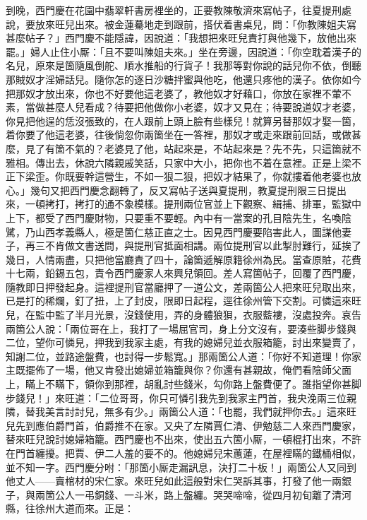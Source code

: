 到晚，西門慶在花園中翡翠軒書房裡坐的，正要教陳敬濟來寫帖子，往夏提刑處說，要放來旺兒出來。被金蓮驀地走到跟前，搭伏着書桌兒，{}問：「你教陳姐夫寫甚麼帖子？」西門慶不能隱諱，因說道：「我想把來旺兒責打與他幾下，放他出來罷。」婦人止住小厮：「且不要叫陳姐夫來。」坐在旁邊，因說道：「你空耽着漢子的名兒，原來是箇隨風倒舵、順水推船的行貨子！我那等對你說的話兒你不依，倒聽那賊奴才淫婦話兒。隨你怎的逐日沙糖拌蜜與他吃，他還只疼他的漢子。依你如今把那奴才放出來，你也不好要他這老婆了，教他奴才好藉口，你放在家裡不葷不素，當做甚麼人兒看成？待要把他做你小老婆，奴才又見在；待要說道奴才老婆，你見把他逞的恁沒張致的，在人跟前上頭上臉有些樣兒！就算另替那奴才娶一箇，着你要了他這老婆，往後倘忽你兩箇坐在一答裡，那奴才或走來跟前回話，或做甚麼，見了有箇不氣的？老婆見了他，站起來是，不站起來是？先不先，只這箇就不雅相。{}傳出去，休說六隣親戚笑話，只家中大小，把你也不着在意裡。正是上梁不正下梁歪。你既要幹這營生，不如一狠二狠，把奴才結果了，{}你就摟着他老婆也放心。」{}幾句又把西門慶念翻轉了，反又寫帖子送與夏提刑，教夏提刑限三日提出來，一頓拷打，拷打的通不象模樣。提刑兩位官並上下觀察、緝捕、排軍，監獄中上下，都受了西門慶財物，只要重不要輕。內中有一當案的孔目陰先生，名喚陰騭，乃山西孝義縣人，極是箇仁慈正直之士。因見西門慶要陷害此人，圖謀他妻子，再三不肯做文書送問，與提刑官抵面相講。兩位提刑官以此掣肘難行，延挨了幾日，人情兩盡，只把他當廳責了四十，論箇遞解原籍徐州為民。當查原賍，花費十七兩，鉛錫五包，責令西門慶家人來興兒領回。差人寫箇帖子，回覆了西門慶，隨教即日押發起身。這裡提刑官當廳押了一道公文，差兩箇公人把來旺兒取出來，已是打的稀爛，釘了扭，上了封皮，限即日起程，逕往徐州管下交割。可憐這來旺兒，在監中監了半月光景，沒錢使用，弄的身體狼狽，衣服藍褸，沒處投奔。哀告兩箇公人說：「兩位哥在上，我打了一場屈官司，身上分文沒有，要湊些脚步錢與二位，望你可憐見，押我到我家主處，有我的媳婦兒並衣服箱籠，討出來變賣了，知謝二位，並路途盤費，也討得一步鬆寬。」那兩箇公人道：「你好不知道理！你家主既擺佈了一場，他又肯發出媳婦並箱籠與你？{}你還有甚親故，俺們看陰師父面上，瞞上不瞞下，領你到那裡，胡亂討些錢米，勾你路上盤費便了。誰指望你甚脚步錢兒！」來旺道：「二位哥哥，你只可憐引我先到我家主門首，我央浼兩三位親隣，替我美言討討兒，無多有少。」兩箇公人道：「也罷，我們就押你去。」這來旺兒先到應伯爵門首，伯爵推不在家。{}又央了左隣賈仁清、伊勉慈二人來西門慶家，替來旺兒說討媳婦箱籠。西門慶也不出來，使出五六箇小厮，一頓棍打出來，不許在門首纏擾。把賈、伊二人羞的要不的。他媳婦兒宋蕙蓮，在屋裡瞞的鐵桶相似，並不知一字。西門慶分咐：「那箇小厮走漏訊息，決打二十板！」兩箇公人又同到他丈人——賣棺材的宋仁家。來旺兒如此這般對宋仁哭訴其事，打發了他一兩銀子，與兩箇公人一弔銅錢、一斗米，路上盤纏。哭哭啼啼，從四月初旬離了清河縣，往徐州大道而來。正是：

